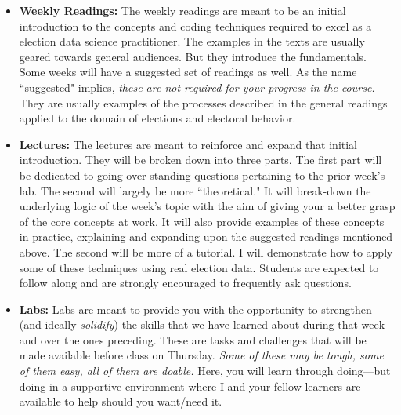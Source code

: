 \documentclass[11pt]{article}
\begin{document}
\begin{itemize}
\item \textbf{Weekly Readings:} The weekly readings are meant to be an initial introduction to the concepts and coding techniques required to excel as a election data science practitioner. The examples in the texts are usually geared towards general audiences. But they introduce the fundamentals. Some weeks will have a suggested set of readings as well. As the name ``suggested" implies, \textit{these are not required for your progress in the course.} They are usually examples of the processes described in the general readings applied to the domain of elections and electoral behavior.
\item \textbf{Lectures:} The lectures are meant to reinforce and expand that initial introduction. They will be broken down into three parts. The first part will be dedicated to going over standing questions pertaining to the prior week's lab.
 The second will largely be more ``theoretical." It will break-down the underlying logic of the week's topic with the aim of giving your a better grasp of the core concepts at work. It will also provide examples of these concepts in practice, explaining and expanding upon the suggested readings mentioned above. The second will be more of a tutorial. I will demonstrate how to apply some of these techniques using real election data. Students are expected to follow along and are strongly encouraged to frequently ask questions. 
\item \textbf{Labs:} Labs are meant to provide you with the opportunity to strengthen (and ideally \textit{solidify}) the skills that we have learned about during that week and over the ones preceding. These are tasks and challenges that will be made available before class on Thursday. \textit{Some of these may be tough, some of them easy, all of them are doable.} Here, you will learn through doing---but doing in a supportive environment where I and your fellow learners are available to help should you want/need it. 

\end{itemize}
\end{document}
